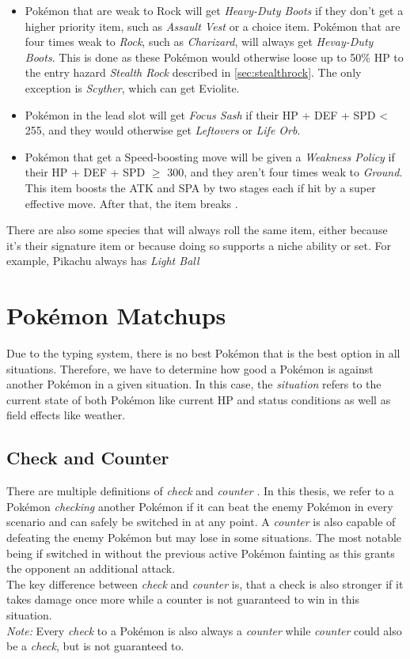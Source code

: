 \begin{itemize}
{	Vest} if their \ac{HP} + \ac{DEF} + \ac{SPD} $\geq$ 235. Otherwise, \textit{Expert Belt},
	\textit{Leftovers} or \textit{Life Orb} is generated.
	\item Pokémon that are weak to Rock will get \textit{Heavy-Duty Boots} if they don't get a 
	higher priority item, such as \textit{Assault Vest} or a choice item. Pokémon that are four
	times weak to \textit{Rock}, such as \textit{Charizard}, will always get \textit{Hevay-Duty Boots}.
	This is done as these Pokémon would otherwise loose up to 50\% \ac{HP} to the entry hazard
	\textit{Stealth Rock} described in \ref{sec:stealthrock}. The only exception is \textit{Scyther},
	which can get Eviolite.
	\item Pokémon in the lead slot will get \textit{Focus Sash} if their \ac{HP} + \ac{DEF} + \ac{SPD} < 255,
	and they would otherwise get \textit{Leftovers} or \textit{Life Orb}.
	\item Pokémon that get a Speed-boosting move will be given a \textit{Weakness Policy} if their \ac{HP}
	+ \ac{DEF} + \ac{SPD} $\geq$ 300, and they aren't four times weak to \textit{Ground}. This item
	boosts the \ac{ATK} and \ac{SPA} by two stages each if hit by a super effective move. After that,
	the item breaks \cite{Bulbapedia:WeaknessPolicy}.
\end{itemize}
There are also some species that will always roll the same item, either because it's their signature item or
because doing so supports a niche ability or set. For example, Pikachu always has \textit{Light Ball}

\section{Pokémon Matchups}
Due to the typing system, there is no best Pokémon that is the best option in all situations. Therefore, we 
have to determine how good a Pokémon is against another Pokémon in a given situation. In this case, the
\textit{situation} refers to the current state of both Pokémon like current \ac{HP} and status conditions
as well as field effects like weather. 
\subsection{Check and Counter}
There are multiple definitions of \textit{check} and \textit{counter} . In
this thesis, we refer to a Pokémon \textit{checking} another Pokémon if it can beat the enemy Pokémon in 
every scenario and can safely be switched in at any point. A \textit{counter} is also capable of defeating
the enemy Pokémon but may lose in some situations. The most notable being if switched in without the
previous active Pokémon fainting as this grants the opponent an additional attack. \\
The key difference between \textit{check} and \textit{counter} is, that a check is also stronger if
it takes damage once more while a counter is not guaranteed to win in this situation. \\
\textit{Note:} Every \textit{check} to a Pokémon is also always a \textit{counter} while \textit{counter}
could also be a \textit{check}, but is not guaranteed to. 